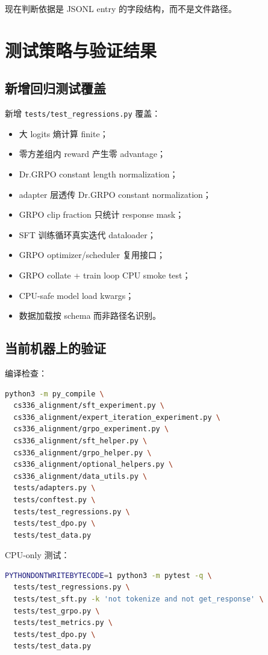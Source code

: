 \documentclass[UTF8,a4paper,11pt]{ctexart}
\begin{document}
现在判断依据是 JSONL entry 的字段结构，而不是文件路径。

\section{测试策略与验证结果}

\subsection{新增回归测试覆盖}

新增 \texttt{tests/test\_regressions.py} 覆盖：

\begin{itemize}[leftmargin=2em]
  \item 大 logits 熵计算 finite；
  \item 零方差组内 reward 产生零 advantage；
  \item Dr.GRPO constant length normalization；
  \item adapter 层透传 Dr.GRPO constant normalization；
  \item GRPO clip fraction 只统计 response mask；
  \item SFT 训练循环真实迭代 dataloader；
  \item GRPO optimizer/scheduler 复用接口；
  \item GRPO collate + train loop CPU smoke test；
  \item CPU-safe model load kwargs；
  \item 数据加载按 schema 而非路径名识别。
\end{itemize}

\subsection{当前机器上的验证}

编译检查：

\begin{lstlisting}[language=bash]
python3 -m py_compile \
  cs336_alignment/sft_experiment.py \
  cs336_alignment/expert_iteration_experiment.py \
  cs336_alignment/grpo_experiment.py \
  cs336_alignment/sft_helper.py \
  cs336_alignment/grpo_helper.py \
  cs336_alignment/optional_helpers.py \
  cs336_alignment/data_utils.py \
  tests/adapters.py \
  tests/conftest.py \
  tests/test_regressions.py \
  tests/test_dpo.py \
  tests/test_data.py
\end{lstlisting}

CPU-only 测试：

\begin{lstlisting}[language=bash]
PYTHONDONTWRITEBYTECODE=1 python3 -m pytest -q \
  tests/test_regressions.py \
  tests/test_sft.py -k 'not tokenize and not get_response' \
  tests/test_grpo.py \
  tests/test_metrics.py \
  tests/test_dpo.py \
  tests/test_data.py
\end{lstlisting}
\end{document}
